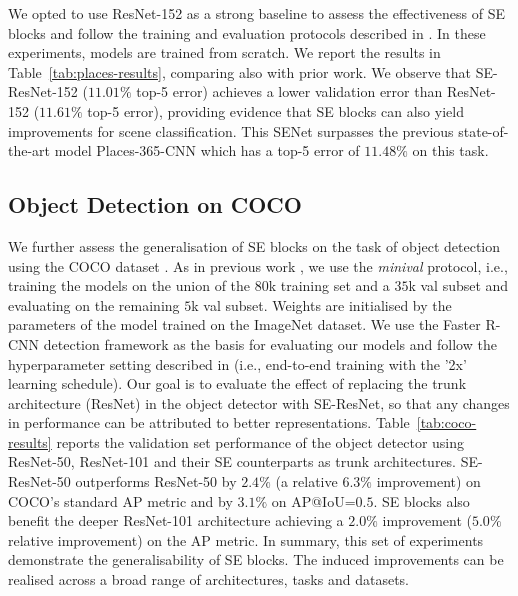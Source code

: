 We opted to use ResNet-152 as a strong baseline to assess the effectiveness of SE blocks and follow the training and evaluation protocols described in \cite{shen_places365, shen_eccv2016}. In these experiments, models are trained from scratch. We report the results in Table~\ref{tab:places-results}, comparing also with prior work. We observe that SE-ResNet-152 ($11.01\%$ {\mbox top-5} error) achieves a lower validation error than ResNet-152 ($11.61\%$ top-5 error), providing evidence that SE blocks can also yield improvements for scene classification. This SENet surpasses the previous state-of-the-art model Places-365-CNN \cite{shen_places365} which has a top-5 error of $11.48\%$ on this task.

	

\subsection{Object Detection on COCO}
\label{coco_det}

We further assess the generalisation of SE blocks on the task of object detection using the COCO dataset \cite{lin_eccv2014coco}. As in previous work \cite{xie_cvpr2017resnext}, we use the {\it minival} protocol, i.e., training the models on the union of the $80$k training set and a $35$k val subset and evaluating on the remaining $5$k val subset.  Weights are initialised by the parameters of the model trained on the ImageNet dataset. We use the Faster \mbox{R-CNN} \cite{ren_nips2015fasterrcnn} detection framework as the basis for evaluating our models and follow the hyperparameter setting described in \cite{Detectron2018} (i.e., end-to-end training with the '2x' learning schedule). Our goal is to evaluate the effect of replacing the trunk architecture (ResNet) in the object detector with \mbox{SE-ResNet}, so that any changes in performance can be attributed to better representations.
Table~\ref{tab:coco-results} reports the validation set performance of the object detector using \mbox{ResNet-50}, \mbox{ResNet-101} and their SE counterparts as trunk architectures. \mbox{SE-ResNet-50} outperforms \mbox {ResNet-50} by $2.4\%$ (a relative $6.3\%$ improvement) on COCO's standard AP metric and by $3.1\%$ on AP@IoU=$0.5$. SE blocks also benefit the deeper \mbox{ResNet-101} architecture achieving a $2.0\%$ improvement ($5.0\%$ relative improvement) on the AP metric.
In summary, this set of experiments demonstrate the generalisability of SE blocks. The induced improvements can be realised across a broad range of architectures, tasks and datasets.

